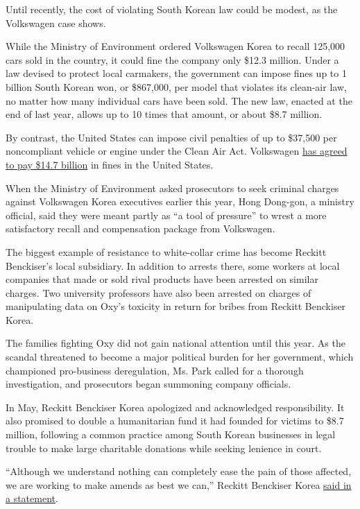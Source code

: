 Until recently, the cost of violating South Korean law could be modest,
as the Volkswagen case shows.

While the Ministry of Environment ordered Volkswagen Korea to recall
125,000 cars sold in the country, it could fine the company only \$12.3
million. Under a law devised to protect local carmakers, the government
can impose fines up to 1 billion South Korean won, or \$867,000, per
model that violates its clean-air law, no matter how many individual
cars have been sold. The new law, enacted at the end of last year,
allows up to 10 times that amount, or about \$8.7 million.

By contrast, the United States can impose civil penalties of up to
\$37,500 per noncompliant vehicle or engine under the Clean Air Act.
Volkswagen
\href{http://www.nytimes3xbfgragh.onion/2016/06/28/business/volkswagen-settlement-diesel-scandal.html}{has
agreed to pay \$14.7 billion} in fines in the United States.

When the Ministry of Environment asked prosecutors to seek criminal
charges against Volkswagen Korea executives earlier this year, Hong
Dong-gon, a ministry official, said they were meant partly as ``a tool
of pressure'' to wrest a more satisfactory recall and compensation
package from Volkswagen.

The biggest example of resistance to white-collar crime has become
Reckitt Benckiser's local subsidiary. In addition to arrests there, some
workers at local companies that made or sold rival products have been
arrested on similar charges. Two university professors have also been
arrested on charges of manipulating data on Oxy's toxicity in return for
bribes from Reckitt Benckiser Korea.

The families fighting Oxy did not gain national attention until this
year. As the scandal threatened to become a major political burden for
her government, which championed pro-business deregulation, Ms. Park
called for a thorough investigation, and prosecutors began summoning
company officials.

In May, Reckitt Benckiser Korea apologized and acknowledged
responsibility. It also promised to double a humanitarian fund it had
founded for victims to \$8.7 million, following a common practice among
South Korean businesses in legal trouble to make large charitable
donations while seeking lenience in court.

``Although we understand nothing can completely ease the pain of those
affected, we are working to make amends as best we can,'' Reckitt
Benckiser Korea
\href{http://www.rb.com/media/news/2016/may/oxy-rb-and-humidifier-sterilizers-in-korea/}{said
in a statement}.

